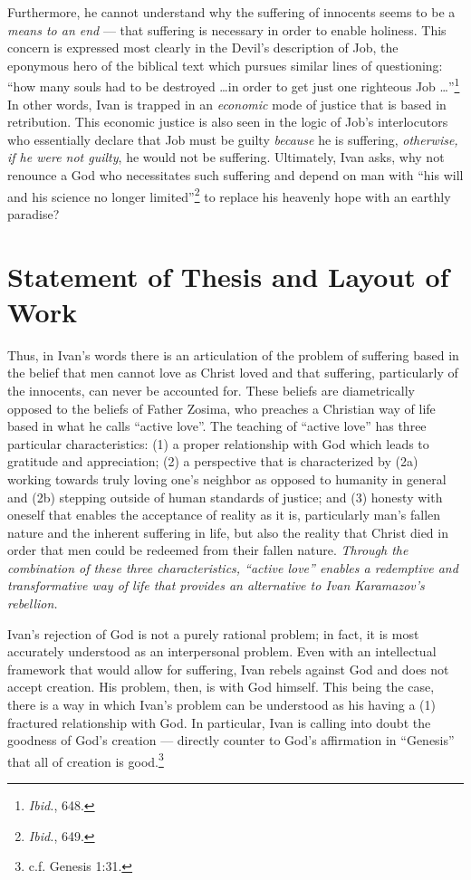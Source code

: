 Furthermore, he cannot understand why the suffering of innocents seems to be a \emph{means to an end} --- that suffering is necessary in order to enable holiness. This concern is expressed most clearly in the Devil's description of Job, the eponymous hero of the biblical text which pursues similar lines of questioning: ``how many souls had to be destroyed \ldots in order to get just one righteous Job \ldots''\footnote{\emph{Ibid.}, 648.} In other words, Ivan is trapped in an \emph{economic} mode of justice that is based in retribution. This economic justice is also seen in the logic of Job's interlocutors who essentially declare that Job must be guilty \emph{because} he is suffering, \emph{otherwise, if he were not guilty}, he would not be suffering.  Ultimately, Ivan asks, why not renounce a God who necessitates such suffering and depend on man with ``his will and his science no longer limited''\footnote{\emph{Ibid.}, 649.} to replace his heavenly hope with an earthly paradise?

\section{Statement of Thesis and Layout of Work}

Thus, in Ivan's words there is an articulation of the problem of suffering based in the belief that men cannot love as Christ loved and that suffering, particularly of the innocents, can never be accounted for. These beliefs are diametrically opposed to the beliefs of Father Zosima, who preaches a Christian way of life based in what he calls ``active love''. The teaching of ``active love'' has three particular characteristics: (1) a proper relationship with God which leads to gratitude and appreciation; (2) a perspective that is characterized by (2a) working towards truly loving one's neighbor as opposed to humanity in general and (2b) stepping outside of human standards of justice; and (3) honesty with oneself that enables the acceptance of reality as it is, particularly man's fallen nature and the inherent suffering in life, but also the reality that Christ died in order that men could be redeemed from their fallen nature. \emph{Through the combination of these three characteristics, ``active love'' enables a redemptive and transformative way of life that provides an alternative to Ivan Karamazov's rebellion.}

Ivan's rejection of God is not a purely rational problem; in fact, it is most accurately understood as an interpersonal problem. Even with an intellectual framework that would allow for suffering, Ivan rebels against God and does not accept creation. His problem, then, is with God himself. This being the case, there is a way in which Ivan's problem can be understood as his having a (1) fractured relationship with God. In particular, Ivan is calling into doubt the goodness of God's creation --- directly counter to God's affirmation in ``Genesis'' that all of creation is good.\footnote{c.f. Genesis 1:31.}

